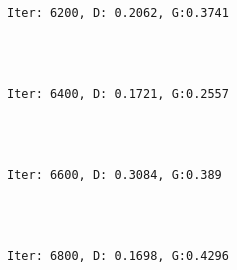 \documentclass[11pt]{article}
\begin{document}
    \begin{center}
    \end{center}
    { \hspace*{\fill} \\}
    
    \begin{Verbatim}[commandchars=\\\{\}]

Iter: 6200, D: 0.2062, G:0.3741
    \end{Verbatim}

    \begin{center}
    \end{center}
    { \hspace*{\fill} \\}
    
    \begin{Verbatim}[commandchars=\\\{\}]

Iter: 6400, D: 0.1721, G:0.2557
    \end{Verbatim}

    \begin{center}
    \end{center}
    { \hspace*{\fill} \\}
    
    \begin{Verbatim}[commandchars=\\\{\}]

Iter: 6600, D: 0.3084, G:0.389
    \end{Verbatim}

    \begin{center}
    \end{center}
    { \hspace*{\fill} \\}
    
    \begin{Verbatim}[commandchars=\\\{\}]

Iter: 6800, D: 0.1698, G:0.4296
    \end{Verbatim}

    \begin{center}
    \end{center}
    { \hspace*{\fill} \\}
    
\end{document}
